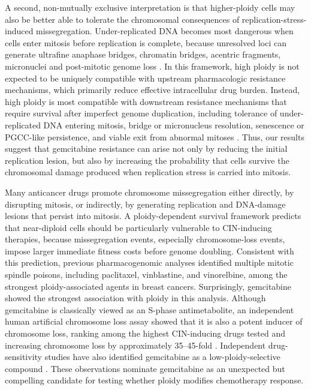 \documentclass[11pt,notitlepage]{article}
\begin{document}
A second, non-mutually exclusive interpretation is that higher-ploidy cells may also be better able to tolerate the chromosomal consequences of replication-stress-induced missegregation. Under-replicated DNA becomes most dangerous when cells enter mitosis before replication is complete, because unresolved loci can generate ultrafine anaphase bridges, chromatin bridges, acentric fragments, micronuclei and post-mitotic genome loss \cite{beeharry_centromere_2013,bhowmick_rad52_2016,kong_rif1_2023}. In this framework, high ploidy is not expected to be uniquely compatible with upstream pharmacologic resistance mechanisms, which primarily reduce effective intracellular drug burden. Instead, high ploidy is most compatible with downstream resistance mechanisms that require survival after imperfect genome duplication, including tolerance of under-replicated DNA entering mitosis, bridge or micronucleus resolution, senescence or PGCC-like persistence, and viable exit from abnormal mitoses \cite{song_gemcitabine_2016,ma_high-throughput_2025,kuznetsova_chromosomal_2015,quinton_whole-genome_2021}. Thus, our results suggest that gemcitabine resistance can arise not only by reducing the initial replication lesion, but also by increasing the probability that cells survive the chromosomal damage produced when replication stress is carried into mitosis.
  
Many anticancer drugs promote chromosome missegregation either directly, by disrupting mitosis, or indirectly, by generating replication and DNA-damage lesions that persist into mitosis. A ploidy-dependent survival framework predicts that near-diploid cells should be particularly vulnerable to CIN-inducing therapies, because missegregation events, especially chromosome-loss events, impose larger immediate fitness costs before genome doubling. Consistent with this prediction, previous pharmacogenomic analyses identified multiple mitotic spindle poisons, including paclitaxel, vinblastine, and vinorelbine, among the strongest ploidy-associated agents in breast cancers\cite{kimmel_integrating_2020}. Surprisingly, gemcitabine showed the strongest association with ploidy in this analysis. Although gemcitabine is classically viewed as an S-phase antimetabolite, an independent human artificial chromosome loss assay showed that it is also a potent inducer of chromosome loss, ranking among the highest CIN-inducing drugs tested and increasing chromosome loss by approximately 35--45-fold \cite{lee_effects_2016}. Independent drug-sensitivity studies have also identified gemcitabine as a low-ploidy-selective compound \cite{choudhary_identification_2016}. These observations nominate gemcitabine as an unexpected but compelling candidate for testing whether ploidy modifies chemotherapy response.
\end{document}
